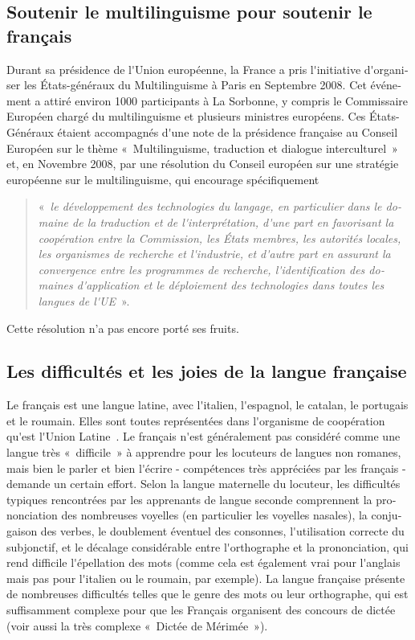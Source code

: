 \begin{french}
\begin{multicols}{2}
\subsection{Soutenir le multilinguisme pour soutenir le français}

Durant sa présidence de l{\mbox '}Union européenne, la France a pris
l{\mbox '}initiative d{\mbox '}organiser les États-généraux du
Multilinguisme à Paris en Septembre 2008. Cet événement a attiré
environ 1000 participants à La Sorbonne, y compris le Commissaire
Européen chargé du multilinguisme et plusieurs ministres
européens. Ces États-Généraux étaient accompagnés d{\mbox '}une note
de la présidence française au Conseil Européen sur le thème
«~Multilinguisme, traduction et dialogue interculturel~» et, en
Novembre 2008, par une résolution du Conseil européen sur une
stratégie européenne sur le multilinguisme, qui encourage
spécifiquement 
\begin{quote}
«~{\em le développement des technologies du langage, en
    particulier dans le domaine de la traduction et de l{\mbox
      '}interprétation, d{\mbox '}une part en favorisant la
    coopération entre la Commission, les États membres, les autorités
    locales, les organismes de recherche et l{\mbox '}industrie, et
    d{\mbox '}autre part en assurant la convergence entre les
    programmes de recherche, l{\mbox '}identification des domaines
    d{\mbox '}application et le déploiement des technologies dans
    toutes les langues de l{\mbox '}UE}~»\cite{eurlex}. 
\end{quote}
Cette résolution n'a pas encore porté ses fruits.

\subsection{Les difficultés et les joies de la langue française}

Le français est une langue latine, avec l{\mbox '}italien, l{\mbox
  '}espagnol, le catalan, le portugais et le roumain. Elles sont
toutes représentées dans l{\mbox '}organisme de coopération qu{\mbox
  '}est l{\mbox '}Union Latine~\cite{ulatine}. Le français n{\mbox
  '}est généralement pas considéré comme une langue très «~difficile~»
à apprendre pour les locuteurs de langues non romanes, mais bien le
parler et bien l{\mbox '}écrire - compétences très appréciées par les
français - demande un certain effort. Selon la langue maternelle du
locuteur, les difficultés typiques rencontrées par les apprenants de
langue seconde comprennent la prononciation des nombreuses voyelles
(en particulier les voyelles nasales), la conjugaison des verbes, le
doublement éventuel des consonnes, l{\mbox '}utilisation correcte du
subjonctif, et le décalage considérable entre l{\mbox '}orthographe et
la prononciation, qui rend difficile l{\mbox '}épellation des mots
(comme cela est également vrai pour l{\mbox '}anglais mais pas pour
l{\mbox '}italien ou le roumain, par exemple). La langue française
présente de nombreuses difficultés telles que le genre des mots ou
leur orthographe, qui est suffisamment complexe pour que les Français
organisent des concours de dictée (voir aussi la très complexe
«~Dictée de Mérimée~»).


\end{multicols}
\end{french}
